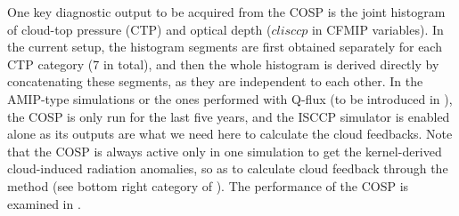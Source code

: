 One key diagnostic output to be acquired from the COSP is the joint histogram of cloud-top pressure (CTP) and optical depth ($clisccp$ in CFMIP variables). In the current setup, the histogram segments are first obtained separately for each CTP category (7 in total), and then the whole histogram is derived directly by concatenating these segments, as they are independent to each other. In the AMIP-type simulations or the ones performed with Q-flux (to be introduced in ), the COSP is only run for the last five years, and the ISCCP simulator is enabled alone as its outputs are what we need here to calculate the cloud feedbacks. Note that the COSP is always active only in one simulation to get the kernel-derived cloud-induced radiation anomalies, so as to calculate cloud feedback through the \cite{Gregory2004} method  (see bottom right category of ). The performance of the COSP is examined in .





